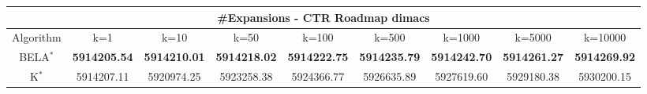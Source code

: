 \begin{tabular}{c|cccccccc}\toprule
\multicolumn{9}{c}{#Expansions - CTR Roadmap dimacs}\\ \midrule
Algorithm & k=1 & k=10 & k=50 & k=100 & k=500 & k=1000 & k=5000 & k=10000 \\ \midrule
BELA$^*$ & \textbf{5914205.54} & \textbf{5914210.01} & \textbf{5914218.02} & \textbf{5914222.75} & \textbf{5914235.79} & \textbf{5914242.70} & \textbf{5914261.27} & \textbf{5914269.92} \\
K$^*$ & 5914207.11 & 5920974.25 & 5923258.38 & 5924366.77 & 5926635.89 & 5927619.60 & 5929180.38 & 5930200.15 \\ \bottomrule 
\end{tabular}
